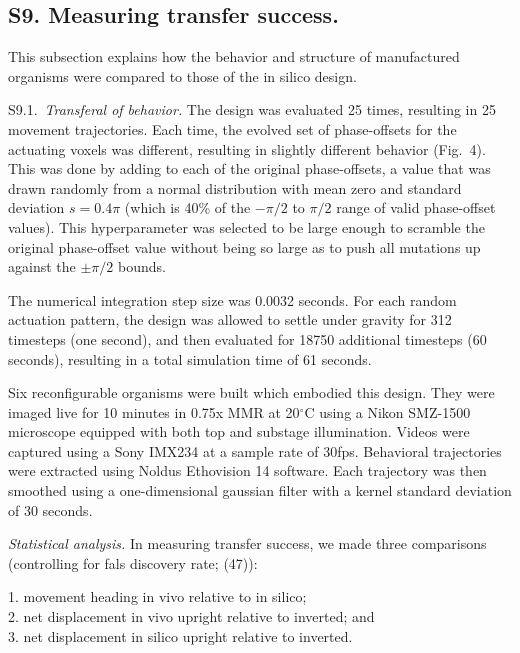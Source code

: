 \subsection*{S9. Measuring transfer success.}

This subsection explains how the behavior and structure of manufactured organisms were compared to those of the in silico design.

\vspace{1em}

S9.1.~\textit{Transferal of behavior.}
The design was evaluated 25 times, resulting in 25 movement trajectories. 
Each time, the evolved set of phase-offsets for the actuating voxels was different, resulting in slightly different behavior (Fig.~4). 
This was done by adding to each of the original phase-offsets, a value that was drawn randomly from a normal distribution with mean zero and standard deviation {$s = 0.4\pi$} (which is 40\% of the {$-\pi/2$} to {$\pi/2$} range of valid phase-offset values). 
This hyperparameter was selected to be large enough to scramble the original phase-offset value without being so large as to push all mutations up against the {$\pm\pi/2$} bounds.

The numerical integration step size was 0.0032 seconds. 
For each random actuation pattern, the design was allowed to settle under gravity for 312 timesteps (one second), and then evaluated for 18750 additional timesteps (60 seconds), resulting in a total simulation time of 61 seconds. 

Six reconfigurable organisms were built which embodied this design. 
They were imaged live for 10 minutes in 0.75x MMR at 20{$^{\circ}$}C using a Nikon SMZ-1500 microscope equipped with both top and substage illumination. Videos were captured using a Sony IMX234 at a sample rate of 30fps. 
Behavioral trajectories were extracted using Noldus Ethovision 14 software. 
Each trajectory was then smoothed using a one-dimensional gaussian filter with a kernel standard deviation of 30 seconds.

\vspace{1em}

\textit{Statistical analysis.}  
In measuring transfer success, we made three comparisons (controlling for fals discovery rate; (47)):

\begin{changemargin}{5em}{5em} 
1. movement heading in vivo relative to in silico;\\
2. net displacement in vivo upright relative to inverted; and \\
3. net displacement in silico upright relative to inverted.
\end{changemargin}

